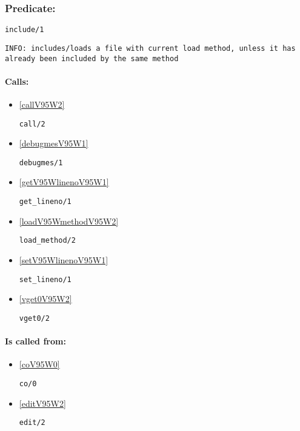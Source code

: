 \subsubsection{Predicate:} \label{includeV95W1}

\begin{verbatim}
include/1
\end{verbatim}

{\small \begin{verbatim}
INFO: includes/loads a file with current load method, unless it has already been included by the same method

\end{verbatim}}
\paragraph{Calls:} 
\begin{itemize}
\item \ref{callV95W2} 
\begin{verbatim}
call/2
\end{verbatim}

\item \ref{debugmesV95W1} 
\begin{verbatim}
debugmes/1
\end{verbatim}

\item \ref{getV95WlinenoV95W1} 
\begin{verbatim}
get_lineno/1
\end{verbatim}

\item \ref{loadV95WmethodV95W2} 
\begin{verbatim}
load_method/2
\end{verbatim}

\item \ref{setV95WlinenoV95W1} 
\begin{verbatim}
set_lineno/1
\end{verbatim}

\item \ref{vget0V95W2} 
\begin{verbatim}
vget0/2
\end{verbatim}

\end{itemize}
\paragraph{Is called from:} 
\begin{itemize}
\item \ref{coV95W0} 
\begin{verbatim}
co/0
\end{verbatim}

\item \ref{editV95W2} 
\begin{verbatim}
edit/2
\end{verbatim}

\end{itemize}


